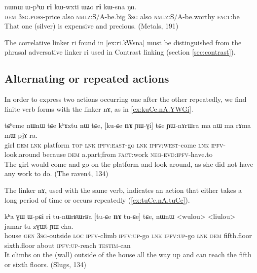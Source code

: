 \documentclass[oldfontcommands,oneside,a4paper,11pt]{article}
\newcommand{\ipa}[1]{{\phon \mbox{#1}}} %
\begin{document}
 \begin{exe}
\ex \label{ex:ri.kWsna}
\gll
\ipa{nɯnɯ}  	\ipa{ɯ-pʰɯ}  	\ipa{\textbf{ri}}  	\ipa{kɯ-wxti}  	\ipa{ɯʑo}  	\ipa{\textbf{ri}}  	\ipa{kɯ-sna}  	\ipa{ŋu.}  \\
\textsc{dem} \textsc{3sg.poss}-price also \textsc{nmlz:S/A}-be.big \textsc{3sg} also \textsc{nmlz:S/A}-be.worthy \textsc{fact}:be \\
\glt That one (silver) is expensive and precious. (Metals, 191)
\end{exe}

The correlative linker \ipa{ri} found in \ref{ex:ri.kWsna} must be distinguished from the phrasal adversative linker \ipa{ri} used in Contrast linking (section \ref{sec:contrast}).

\subsection{Alternating or repeated actions} \label{sec:alternating}

In order to express two actions occurring one after the other repeatedly, we find finite verb forms with the linker \ipa{nɤ}, as in \ref{ex:kuCe.nA.YWGi}.

\begin{exe}
\ex \label{ex:kuCe.nA.YWGi}
\gll
\ipa{tɕʰeme}  	\ipa{nɯnɯ}  	\ipa{tɕe}  	\ipa{kʰɤxtu}  	\ipa{nɯ}  	\ipa{tɕe,}  	[\ipa{ku-ɕe}  	\ipa{\textbf{nɤ}}  	\ipa{ɲɯ-ɣi}]  	\ipa{tɕe}  	\ipa{ɲɯ-nɤrɯra}  	\ipa{ma}  	\ipa{nɯ}  	\ipa{ma}  	\ipa{rɤma}  	\ipa{mɯ-pjɤ-ra.}  \\
girl \textsc{dem} \textsc{lnk} platform \textsc{top} \textsc{lnk} \textsc{ipfv:east}-go \textsc{lnk} \textsc{ipfv:west}-come \textsc{lnk} \textsc{ipfv}-look.around because \textsc{dem} a.part;from \textsc{fact}:work \textsc{neg-evd:ipfv}-have.to \\ 
\glt The girl would come and go on the platform and look around, as she did not have any work to do. (The raven4, 134)
\end{exe}


The linker \ipa{nɤ}, used with the same verb, indicates an action that either takes a long period of time or occurs repeatedly (\ref{ex:tuCe.nA.tuCe}).
\begin{exe}
\ex \label{ex:tuCe.nA.tuCe}
\gll
\ipa{kʰa}  	\ipa{ɣɯ}  	\ipa{ɯ-pɕi}  	\ipa{ri}  	\ipa{tu-nɯrʁɯrʁa}  	[\ipa{tu-ɕe}  	\ipa{\textbf{nɤ}}  	\ipa{tu-ɕe}]  	\ipa{tɕe,}  	\ipa{nɯnɯ}  	<wulou>  	<liulou>  	\ipa{jamar}  	\ipa{tu-zɣɯt}  	\ipa{ɲɯ-cha.}  \\
house \textsc{gen} \textsc{3sg}-outside \textsc{loc} \textsc{ipfv}-climb \textsc{ipfv:up}-go \textsc{lnk} \textsc{ipfv:up}-go \textsc{lnk} \textsc{dem} fifth.floor sixth.floor about \textsc{ipfv:up}-reach \textsc{testim}-can \\
\glt It climbs on the (wall) outside of the house all the way up and can reach the fifth or   sixth floors.
(Slugs, 134)
\end{exe}
 
\end{document}
